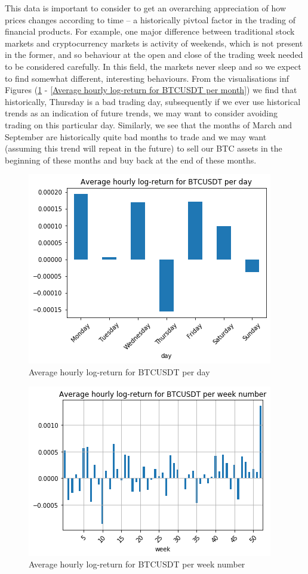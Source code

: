 \documentclass[twoside]{report}
\begin{document}
\begin{spacing}{1}
This data is important to consider to get an overarching appreciation of how prices changes according to time -- a historically pivtoal factor in the trading of financial products. For example, one major difference between traditional stock markets and cryptocurrency markets is activity of weekends, which is not present in the former, and so behaviour at the open and close of the trading week needed to be considered carefully. In this field, the markets never sleep and so we expect to find somewhat different, interesting behaviours.
From the visualisations inf Figures (\ref{Average hourly log-return for BTCUSDT per day} - \ref{Average hourly log-return for BTCUSDT per month}) we find that historically, Thursday is a bad trading day, subsequently if we ever use historical trends as an indication of future trends, we may want to consider avoiding trading on this particular day. Similarly, we see that the months of March and September are historically quite bad months to trade and we may want (assuming this trend will repeat in the future) to sell our BTC assets in the beginning of these months and buy back at the end of these months.
\begin{figure}[!htbp]
    \centering
    \includegraphics[width=0.7\linewidth]{Images/Average hourly log-return for BTCUSDT per day.png}
    \caption{Average hourly log-return for BTCUSDT per day}
    \label{Average hourly log-return for BTCUSDT per day}
\end{figure}

\begin{figure}[!htbp]
    \centering
    \includegraphics[width=0.7\linewidth]{Images/Average hourly log-return for BTCUSDT per week number.png}
    \caption{Average hourly log-return for BTCUSDT per week number}
    \label{Average hourly log-return for BTCUSDT per week number}
\end{figure}


\end{spacing}
\end{document}
